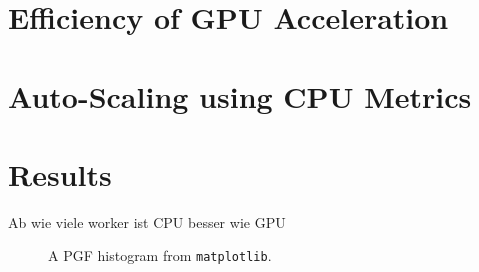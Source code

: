 \section{Efficiency of GPU Acceleration}


\section{Auto-Scaling using CPU Metrics}


\section{Results}
Ab wie viele worker ist CPU besser wie GPU

\begin{figure}
    \begin{center}
        
    \end{center}
    \caption{A PGF histogram from \texttt{matplotlib}.}
\end{figure}
